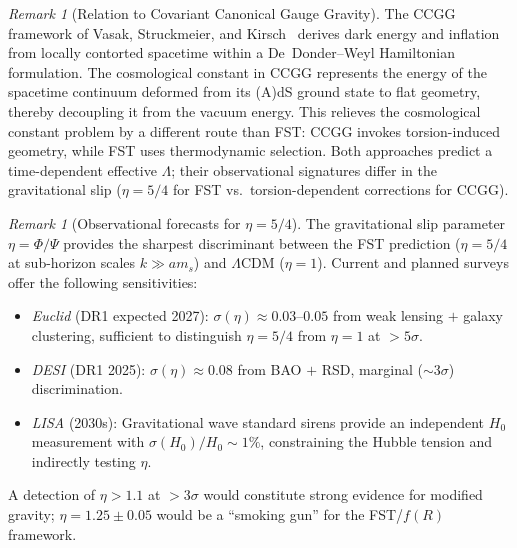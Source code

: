 \documentclass[12pt,a4paper]{article}
\theoremstyle{definition}
\theoremstyle{plain}
\theoremstyle{remark}
\newtheorem{remark}[definition]{Remark}
\begin{document}
\begin{remark}[Relation to Covariant Canonical Gauge Gravity]
\label{rem:ccgg}
The CCGG framework of Vasak, Struckmeier, and Kirsch~\cite{VasakCCGG2020} derives dark energy and inflation from locally contorted spacetime within a De~Donder--Weyl Hamiltonian formulation. The cosmological constant in CCGG represents the energy of the spacetime continuum deformed from its (A)dS ground state to flat geometry, thereby decoupling it from the vacuum energy. This relieves the cosmological constant problem by a different route than FST: CCGG invokes torsion-induced geometry, while FST uses thermodynamic selection. Both approaches predict a time-dependent effective $\Lambda$; their observational signatures differ in the gravitational slip ($\eta = 5/4$ for FST vs.\ torsion-dependent corrections for CCGG).
\end{remark}

\begin{remark}[Observational forecasts for $\eta = 5/4$]
\label{rem:forecasts}
The gravitational slip parameter $\eta = \Phi/\Psi$ provides the sharpest discriminant between the FST prediction ($\eta = 5/4$ at sub-horizon scales $k \gg a m_s$) and $\Lambda$CDM ($\eta = 1$). Current and planned surveys offer the following sensitivities:
\begin{itemize}
\item \emph{Euclid} (DR1 expected 2027): $\sigma(\eta) \approx 0.03$--$0.05$ from weak lensing $+$ galaxy clustering, sufficient to distinguish $\eta = 5/4$ from $\eta = 1$ at $> 5\sigma$.
\item \emph{DESI} (DR1 2025): $\sigma(\eta) \approx 0.08$ from BAO $+$ RSD, marginal ($\sim 3\sigma$) discrimination.
\item \emph{LISA} (2030s): Gravitational wave standard sirens provide an independent $H_0$ measurement with $\sigma(H_0)/H_0 \sim 1\%$, constraining the Hubble tension and indirectly testing $\eta$.
\end{itemize}
A detection of $\eta > 1.1$ at $> 3\sigma$ would constitute strong evidence for modified gravity; $\eta = 1.25 \pm 0.05$ would be a ``smoking gun'' for the FST/$f(R)$ framework.
\end{remark}
\end{document}
